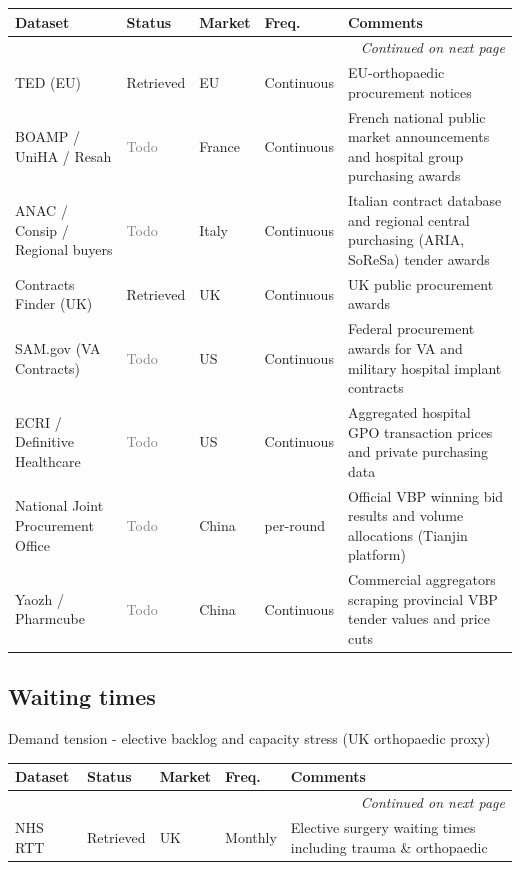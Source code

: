\documentclass{article}
\begin{document}
\small
\setlength{\tabcolsep}{4pt}
\renewcommand{\arraystretch}{1.15}
\begin{longtable}{@{}p{3.0cm}p{2.0cm}p{2.1cm}p{1.9cm}p{5.8cm}@{}}
\toprule
\textbf{Dataset} & \textbf{Status} & \textbf{Market} & \textbf{Freq.} & \textbf{Comments} \\
\midrule
\endhead
\midrule
\multicolumn{5}{r}{\textit{Continued on next page}} \\
\endfoot
\bottomrule
\endlastfoot
TED (EU) & \textcolor{green!60!black}{Retrieved} & EU & Continuous & EU-orthopaedic procurement notices \\
BOAMP / UniHA / Resah & \textcolor{gray}{Todo} & France & Continuous & French national public market announcements and hospital group purchasing awards \\
ANAC / Consip / Regional buyers & \textcolor{gray}{Todo} & Italy & Continuous & Italian contract database and regional central purchasing (ARIA, SoReSa) tender awards \\
Contracts Finder (UK) & \textcolor{green!60!black}{Retrieved} & UK & Continuous & UK public procurement awards \\
SAM.gov (VA Contracts) & \textcolor{gray}{Todo} & US & Continuous & Federal procurement awards for VA and military hospital implant contracts \\
ECRI / Definitive Healthcare & \textcolor{gray}{Todo} & US & Continuous & Aggregated hospital GPO transaction prices and private purchasing data \\
National Joint Procurement Office & \textcolor{gray}{Todo} & China & per-round & Official VBP winning bid results and volume allocations (Tianjin platform) \\
Yaozh / Pharmcube & \textcolor{gray}{Todo} & China & Continuous & Commercial aggregators scraping provincial VBP tender values and price cuts \\
\end{longtable}
\normalsize

\subsection{Waiting times}
Demand tension - elective backlog and capacity stress (UK orthopaedic proxy)\\[0.5em]

\small
\setlength{\tabcolsep}{4pt}
\renewcommand{\arraystretch}{1.15}
\begin{longtable}{@{}p{3.0cm}p{2.0cm}p{2.1cm}p{1.9cm}p{5.8cm}@{}}
\toprule
\textbf{Dataset} & \textbf{Status} & \textbf{Market} & \textbf{Freq.} & \textbf{Comments} \\
\midrule
\endhead
\midrule
\multicolumn{5}{r}{\textit{Continued on next page}} \\
\endfoot
\bottomrule
\endlastfoot
NHS RTT & \textcolor{green!60!black}{Retrieved} & UK & Monthly & Elective surgery waiting times including trauma \& orthopaedic \\
\end{longtable}
\normalsize
\end{document}
